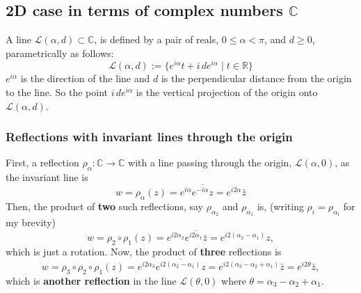 \documentclass{article}
\begin{document}
\subsection{2D case in terms of complex numbers \(\mathbb{C}\)}
\label{sec:org40f7144}
A line \(\mathcal{L}(\alpha, d) \subset \mathbb{C}\), is defined by a pair of reals, \(0 \le \alpha < \pi\), and \(d \ge 0\), parametrically as follows:
\begin{equation}
\mathcal{L}(\alpha, d) := \{ e^{i\alpha}t + i \, d e^{i\alpha} \mid t \in \mathbb{R} \}
\end{equation}
\(e^{i\alpha}\) is the direction of the line and \(d\) is the perpendicular distance from the origin to the line. So the point \(i\, d e^{i\alpha}\) is the vertical projection of the origin onto \(\mathcal{L}(\alpha, d)\).
\subsubsection{Reflections with invariant lines through the origin}
\label{sec:org51add9a}
First, a reflection \(\rho_{\alpha}:\mathbb{C} \rightarrow \mathbb{C}\) with a line passing through the origin, \(\mathcal{L}(\alpha, 0)\), as the invariant line is
\begin{equation}
w = \rho_{\alpha} (z) = e^{i\alpha} \overline{e^{-i\alpha} z} = e^{i2\alpha} \bar{z}
\end{equation}
Then, the product of \textbf{two} such reflections, say \(\rho_{\alpha_{2}}\) and \(\rho_{\alpha_{1}}\) is, (writing \(\rho_{i} = \rho_{\alpha_{i}}\) for my brevity)
\begin{equation}
w = \rho_{2} \circ \rho_{1} (z) = e^{i2\alpha_{2}} \overline{e^{i2\alpha_{1}} \bar{z}} = e^{i2(\alpha_{2} - \alpha_{1})} z,
\end{equation}
which is just a rotation. Now, the product of \textbf{three} reflections is
\begin{equation}
w = \rho_{3} \circ \rho_{2} \circ \rho_{1} (z) = e^{i2\alpha_{3}} \overline{e^{i2(\alpha_{2} - \alpha_{1})} z} = e^{i2(\alpha_{3} - \alpha_{2} + \alpha_{1})} \bar{z} = e^{i2\theta} \bar{z},
\end{equation}
which is \textbf{another reflection} in the line \(\mathcal{L}(\theta, 0)\) where \(\theta = \alpha_{3} - \alpha_{2} + \alpha_{1}\).\\
\end{document}
